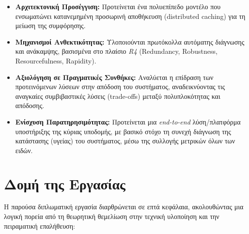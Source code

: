 \begin{itemize}
	\item \textbf{Αρχιτεκτονική Προσέγγιση:} Προτείνεται ένα πολυεπίπεδο
	      μοντέλο που ενσωματώνει κατανεμημένη προσωρινή αποθήκευση
	      (distributed caching) για τη μείωση της συμφόρησης.
	\item \textbf{Μηχανισμοί Ανθεκτικότητας:} Υλοποιούνται πρωτόκολλα
	      αυτόματης διάγνωσης και ανάκαμψης, βασισμένα στο πλαίσιο
	      \textit{R4} (Redundancy, Robustness, Resourcefulness,
	      Rapidity).
	\item \textbf{Αξιολόγηση σε Πραγματικές Συνθήκες:} Αναλύεται η επίδραση
	      των προτεινόμενων λύσεων στην απόδοση του συστήματος,
	      αναδεικνύοντας τις αναγκαίες συμβιβαστικές λύσεις (trade-offs)
	      μεταξύ πολυπλοκότητας και απόδοσης.
	\item \textbf{Ενίσχυση Παρατηρησιμότητας:} Προτείνεται μια
	      \textit{end-to-end} λύση/πλατφόρμα υποστήριξης της κύριας
	      υποδομής, με βασικό στόχο τη συνεχή διάγνωση της κατάστασης
	      (υγείας) του συστήματος, μέσω της συλλογής μετρικών όλων των
	      ειδών.
\end{itemize}

\section{Δομή της Εργασίας}

Η παρούσα διπλωματική εργασία διαρθρώνεται σε επτά κεφάλαια, ακολουθώντας μια
λογική πορεία από τη θεωρητική θεμελίωση στην τεχνική υλοποίηση και την
πειραματική επαλήθευση:

